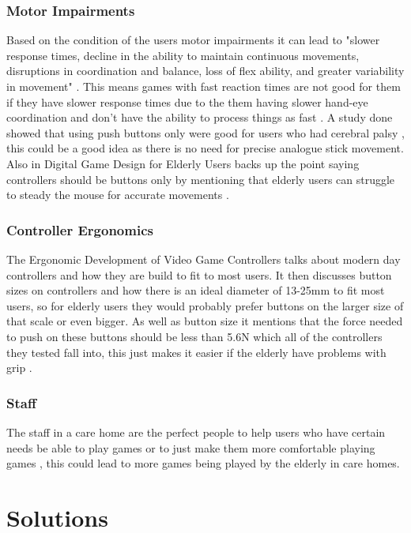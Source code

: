 \documentclass[journal]{IEEEtran}
\begin{document}
\subsubsection{Motor Impairments}
Based on the condition of the users motor impairments it can lead to "slower response times, decline in the ability to maintain continuous movements, disruptions in coordination and balance, loss of flex ability, and greater variability in movement" \cite{ijsselsteijn_digital_2007}. This means games with fast reaction times are not good for them if they have slower response times due to the them having slower hand-eye coordination and don't have the ability to process things as fast \cite{ijsselsteijn_digital_2007}. A study done showed that using push buttons only were good for users who had cerebral palsy \cite{soto_online_2015}, this could be a good idea as there is no need for precise analogue stick movement. Also in Digital Game Design for Elderly Users backs up the point saying controllers should be buttons only by mentioning that elderly users can struggle to steady the mouse for accurate movements \cite{ijsselsteijn_digital_2007}.

\subsubsection{Controller Ergonomics}
The Ergonomic Development of Video Game Controllers \cite{bhardwaj_ergonomic_2017} talks about modern day controllers and how they are build to fit to most users. It then discusses button sizes on controllers and how there is an ideal diameter of 13-25mm to fit most users, so for elderly users they would probably prefer buttons on the larger size of that scale or even bigger. As well as button size it mentions that the force needed to push on these buttons should be less than 5.6N which all of the controllers they tested fall into, this just makes it easier if the elderly have problems with grip \cite{noauthor_managing_nodate}.

\subsubsection{Staff}
The staff in a care home are the perfect people to help users who have certain needs be able to play games or to just make them more comfortable playing games \cite{gerling_long-term_2015}, this could lead to more games being played by the elderly in care homes.

\section{Solutions}
\end{document}
